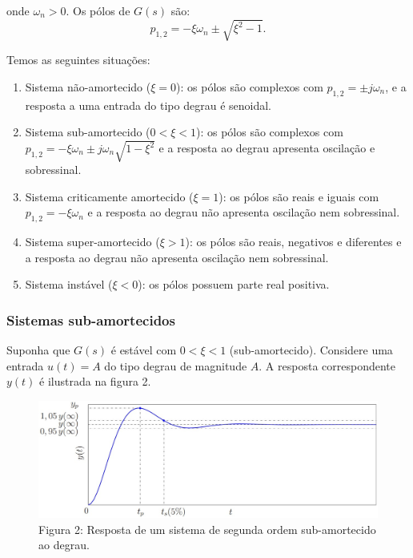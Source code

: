 \documentclass[
]{book}
\providecommand{\tightlist}{%
  \setlength{\itemsep}{0pt}\setlength{\parskip}{0pt}}
\theoremstyle{definition}
\theoremstyle{definition}
\theoremstyle{definition}
\theoremstyle{remark}
\begin{document}
onde \(\omega_n > 0\). Os pólos de \(G(s)\) são:
\[
p_{1,2} = - \xi \omega_n \pm \sqrt{\xi^2 -1}.
\]

Temos as seguintes situações:

\begin{enumerate}
\def\labelenumi{\arabic{enumi}.}
\tightlist
\item
  Sistema não-amortecido (\(\xi = 0\)): os pólos são complexos com \(p_{1,2} = \pm j \omega_n\), e a resposta a uma entrada do tipo degrau é senoidal.
\item
  Sistema sub-amortecido (\(0< \xi <1\)): os pólos são complexos com \(p_{1,2} = - \xi \omega_n \pm j \omega_n\sqrt{1 - \xi^2}\) e a resposta ao degrau apresenta oscilação e sobressinal.
\item
  Sistema criticamente amortecido (\(\xi = 1\)): os pólos são reais e iguais com \(p_{1,2} = -\xi \omega_n\) e a resposta ao degrau não apresenta oscilação nem sobressinal.
\item
  Sistema super-amortecido (\(\xi >1\)): os pólos são reais, negativos e diferentes e a resposta ao degrau não apresenta oscilação nem sobressinal.
\item
  Sistema instável (\(\xi < 0\)): os pólos possuem parte real positiva.
\end{enumerate}

\hypertarget{sistemas-sub-amortecidos}{%
\subsubsection*{Sistemas sub-amortecidos}\label{sistemas-sub-amortecidos}}

Suponha que \(G(s)\) é estável com \(0 < \xi < 1\) (sub-amortecido). Considere uma entrada \(u(t) = A\) do tipo degrau de magnitude \(A\). A resposta correspondente \(y(t)\) é ilustrada na figura 2.

\begin{figure}
\centering
\includegraphics{Imagens/Lab3/Explicação/fig2.jpg}
\caption{Figura 2: Resposta de um sistema de segunda ordem sub-amortecido ao degrau.}
\end{figure}
\end{document}
